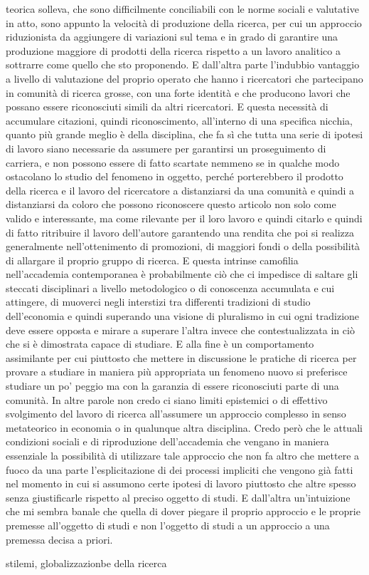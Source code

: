 \documentclass[a4paper, headings=standardclasses]{scrartcl}
\begin{document}
teorica solleva, che sono difficilmente conciliabili con le norme sociali e valutative in atto,
sono appunto la velocità di produzione della ricerca, per cui un approccio riduzionista
da aggiungere di variazioni sul tema e in grado di garantire una produzione maggiore di prodotti
della ricerca rispetto a un lavoro analitico a sottrarre come quello che sto proponendo.
E dall'altra parte l'indubbio vantaggio a livello di valutazione del proprio operato che hanno i
ricercatori che partecipano in comunità di ricerca grosse, con una forte identità e che
producono lavori che possano essere riconosciuti simili da altri ricercatori.
E questa necessità di accumulare citazioni, quindi riconoscimento, all'interno di una
specifica nicchia, quanto più grande meglio è della disciplina, che fa sì che tutta una serie
di ipotesi di lavoro siano necessarie da assumere per garantirsi un proseguimento di carriera,
e non possono essere di fatto scartate nemmeno se in qualche modo ostacolano lo studio del
fenomeno in oggetto, perché porterebbero il prodotto della ricerca e il lavoro del ricercatore
a distanziarsi da una comunità e quindi a distanziarsi da coloro che possono riconoscere
questo articolo non solo come valido e interessante, ma come rilevante per il loro lavoro e quindi
citarlo e quindi di fatto ritribuire il lavoro dell'autore garantendo una rendita che poi si
realizza generalmente nell'ottenimento di promozioni, di maggiori fondi o della possibilità
di allargare il proprio gruppo di ricerca. E questa intrinse camofilia nell'accademia contemporanea
è probabilmente ciò che ci impedisce di saltare gli steccati disciplinari a livello metodologico
o di conoscenza accumulata e cui attingere, di muoverci negli interstizi tra differenti tradizioni
di studio dell'economia e quindi superando una visione di pluralismo in cui ogni tradizione
deve essere opposta e mirare a superare l'altra invece che contestualizzata in ciò che si è
dimostrata capace di studiare. E alla fine è un comportamento assimilante per cui piuttosto
che mettere in discussione le pratiche di ricerca per provare a studiare in maniera più appropriata
un fenomeno nuovo si preferisce studiare un po' peggio ma con la garanzia di essere riconosciuti
parte di una comunità. In altre parole non credo ci siano limiti epistemici o di effettivo svolgimento
del lavoro di ricerca all'assumere un approccio complesso in senso metateorico in economia o in qualunque
altra disciplina. Credo però che le attuali condizioni sociali e di riproduzione dell'accademia
che vengano in maniera essenziale la possibilità di utilizzare tale approccio che non fa altro che
mettere a fuoco da una parte l'esplicitazione di dei processi impliciti che vengono già fatti
nel momento in cui si assumono certe ipotesi di lavoro piuttosto che altre spesso senza giustificarle
rispetto al preciso oggetto di studi. E dall'altra un'intuizione che mi sembra banale
che quella di dover piegare il proprio approccio e le proprie premesse all'oggetto di studi
e non l'oggetto di studi a un approccio a una premessa decisa a priori.

stilemi, globalizzazionbe della ricerca

\printbibliography

	
\end{document}
